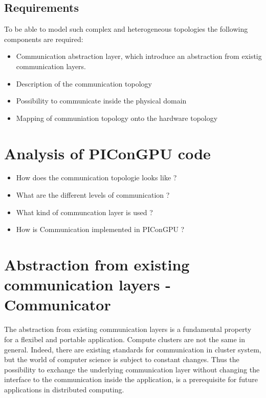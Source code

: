 \subsection{Requirements}
To be able to model such complex and heterogeneous topologies
  the following components are required:

\begin{itemize}
\item Communication abstraction layer, which introduce an abstraction from existig
  communication layers.
\item Description of the communication topology
\item Possibility to communicate inside the physical domain
\item Mapping of communiation topology onto the hardware topology
\end{itemize}

\section{Analysis of PIConGPU code}
\begin{itemize}
  \item How does the communication topologie looks like ?
  \item What are the different levels of communication ?
  \item What kind of communcation layer is used ?
  \item How is Communication implemented in PIConGPU ?
\end{itemize}

\section{Abstraction from existing communication layers - Communicator}
The abstraction from existing communication layers is a fundamental
property for a flexibel and portable application. Compute clusters
are not the same in general. Indeed, there are existing standards
for communication in cluster system, but the world of computer
science is subject to constant changes. Thus the possibility to
exchange the underlying communication layer without changing the
interface to the communication inside the application, is a prerequisite
for future applications in distributed computing.

